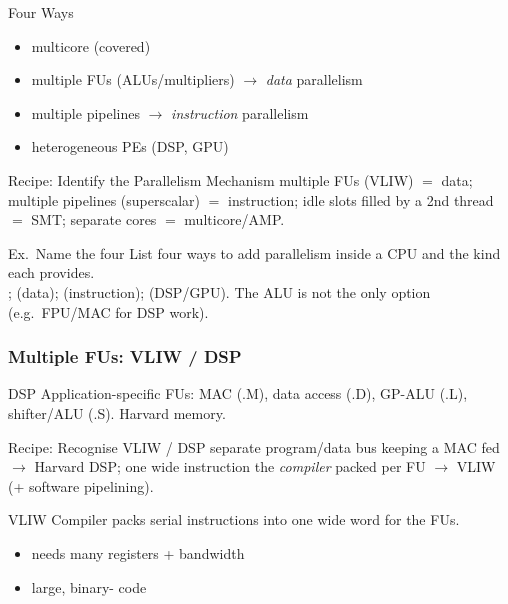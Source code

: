 
\begin{concept}{Four Ways}
    \begin{itemize}
        \item multicore (covered)
        \item multiple FUs (ALUs/multipliers) $\to$ \emph{data} parallelism
        \item multiple pipelines $\to$ \emph{instruction} parallelism
        \item heterogeneous PEs (DSP, GPU)
    \end{itemize}
\end{concept}

\begin{KR}{Recipe: Identify the Parallelism Mechanism}
    multiple FUs (VLIW) $=$ data; multiple pipelines (superscalar) $=$ instruction; idle slots filled by a 2nd thread $=$ SMT; separate cores $=$ multicore/AMP.
\end{KR}

\multend

\begin{example2}{Ex.\ Name the four}
    List four ways to add parallelism inside a CPU and the kind each provides.
     \\ 
    ;  (data);  (instruction);  (DSP/GPU). The ALU is not the only option (e.g.\ FPU/MAC for DSP work).
\end{example2}

\subsubsection{Multiple FUs: VLIW / DSP}


\begin{definition}{DSP}
    Application-specific FUs: MAC (.M), data access (.D), GP-ALU (.L), shifter/ALU (.S). Harvard memory.
\end{definition}

\begin{KR}{Recipe: Recognise VLIW / DSP}
    separate program/data bus keeping a MAC fed $\to$ Harvard DSP; one wide instruction the \emph{compiler} packed per FU $\to$ VLIW (+ software pipelining).
\end{KR}

\begin{definition}{VLIW}
    Compiler packs serial instructions into one wide word for the FUs.
    \begin{itemize}
        \item needs many registers + bandwidth
        \item large, binary- code
    \end{itemize}
\end{definition}

